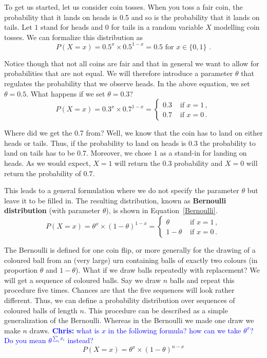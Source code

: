 \documentclass[a4paper,11pt,leqno]{report}
\newcommand{\chris}[1]{ \textcolor{blue}{\textbf{Chris:} #1}}
\begin{document}
To get us started, let us consider coin tosses. When you toss a fair coin, the probability that it lands on heads is 0.5 and
so is the probability that it lands on tails. Let $ 1 $ stand for heads and $ 0 $ for tails in a random variable $ X $ 
modelling coin tosses. We can formalize this distribution as
\begin{equation*}
P(X=x) = 0.5^{x}\times 0.5^{1-x} = 0.5 \mbox{ for $x \in \{0,1\}$ .}
\end{equation*}

Notice though that not all coins are fair and that in general we want to allow for probabilities that are not equal. 
We will therefore introduce a parameter $ \theta $ that regulates the probability that we observe heads. In the
above equation, we set $ \theta = 0.5 $. What happens if we set $ \theta = 0.3 $?
\begin{equation}
P(X=x) = 0.3^{x} \times 0.7^{1-x} = 
\begin{cases}
0.3 & \mbox{ if $x=1$} \, , \\
0.7 & \mbox{ if $x=0$} \, .
\end{cases}
\end{equation}

Where did we get the 0.7 from? Well, we know that the coin has to land on either heads or tails. Thus, if the probability
to land on heads is $ 0.3 $ the probability to land on tails has to be $ 0.7 $. Moreover, we chose $ 1 $ as a stand-in for
landing on heads. As we would expect, $ X = 1 $ will return the $ 0.3 $ probability and $ X = 0 $ will return the probability of $ 0.7 $.

This leads to a general formulation where we do not specify the parameter $ \theta $ but leave it to be filled in. 
The resulting distribution, known as \textbf{Bernoulli distribution} (with parameter $ \theta $), is shown in Equation~\eqref{Bernoulli}.
\begin{equation}\label{Bernoulli}
P(X=x) = \theta^{x} \times (1 - \theta)^{1-x} =
\begin{cases}
\theta & \mbox{ if $x=1$} \, , \\
1-\theta & \mbox{ if $x=0$} \, .
\end{cases}
\end{equation}

The Bernoulli is defined for one coin flip, or more generally for the
drawing of a coloured ball from an (very large) urn containing balls
of exactly two colours (in proportion $\theta$ and $1-\theta$). What if we draw balls repeatedly with replacement? We will get a sequence of coloured balls. 
Say we draw $ n $ balls and repeat this procedure five times. Chances are that the five sequences will look rather different.
Thus, we can define a probability distribution over sequences of
coloured balls of length $ n $. This procedure can be described as a simple generalization
of the Bernoulli. Whereas in the Bernoulli we made one draw we make $
n $ draws. \chris{what is $x$ in the following formula? how can we
  take $\theta^x$? Do you mean $\theta^{\sum_i x_i}$ instead?}
\begin{equation}\label{Multinoulli}
P(X=x) = \theta^{x} \times (1 - \theta)^{n-x}
\end{equation}
\end{document}
